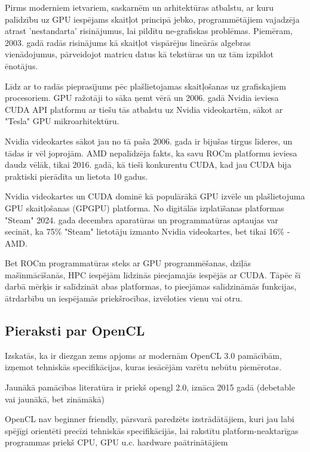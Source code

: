 \documentclass[12pt]{report}%
\theoremstyle{definition}
\begin{document}
Pirms moderniem ietvariem, saskarnēm un arhitektūras atbalstu, ar kuru palīdzību uz GPU iespējams skaitļot
principā jebko, programmētājiem vajadzēja atrast 'nestandarta' risinājumus, lai pildītu ne-grafiskas problēmas.
Piemēram, 2003. gadā radās risinājums kā skaitļot vispārējus lineārās algebras vienādojumus,
pārveidojot matricu datus kā tekstūras un uz tām izpildot ēnotājus. \cite{10.1145/882262.882363}

Līdz ar to radās pieprasījums pēc plašlietojamas skaitļošanas uz grafiskajiem procesoriem. GPU ražotāji
to sāka ņemt vērā un 2006. gadā Nvidia ieviesa CUDA API platformu ar tiešu tās atbalstu uz Nvidia 
videokartēm, sākot ar "Tesla" GPU mikroarhitektūru.\cite{nvidia_tesla_p100}

Nvidia videokartes sākot jau no tā paša 2006. gada ir bijušas tirgus līderes, un tādas ir vēl joprojām.
AMD nepalīdzēja fakts, ka savu ROCm platformu ieviesa daudz vēlāk, tikai 2016. gadā, kā tieši konkurentu CUDA,
kad jau CUDA bija praktiski pierādīta un lietota 10 gadus.

Nvidia videokartes un CUDA dominē kā populārākā GPU izvēle un plašlietojuma GPU skaitļošanas (GPGPU)
platforma. No digitālās izplatīšanas platformas "Steam" 2024. gada decembra aparatūras un programmatūras
aptaujas var secināt, ka 75\% "Steam" lietotāju izmanto Nvidia videokartes, bet tikai 16\% - AMD.
\cite{steam_survey}

Bet ROCm programmatūras steks ar GPU programmēšanas, dziļās mašīnmācīšanās, HPC iespējām līdzinās
pieejamajās iespējās ar CUDA. Tāpēc šī darbā mērķis ir salīdzināt abas platformas, to pieejāmas salīdzināmās
funkcijas, ātrdarbību un iespējamās priekšrocības, izvēloties vienu vai otru.


\begin{center}
\chapter{Pieraksti par OpenCL}
\end{center}

Izskatās, ka ir diezgan zems apjoms ar modernām OpenCL 3.0 pamācībām, izņemot tehniskās
specifikācijas, kuras iesācējām varētu nebūtu piemērotas.

Jaunākā pamācības literatūra ir priekš opengl 2.0, iznāca 2015 gadā \cite{heterogeneous-computing-with-opencl-2-0}(debetable vai jaunākā, bet
zināmākā)

OpenCL nav beginner friendly, pārsvarā paredzēts izstrādātājiem, kuri jau labi spējīgi orientēti precīzi tehniskās specifikācijās,
lai rakstītu platform-neaktarīgas programmas priekš CPU, GPU u.c. hardware paātrinātājiem
\end{document}
